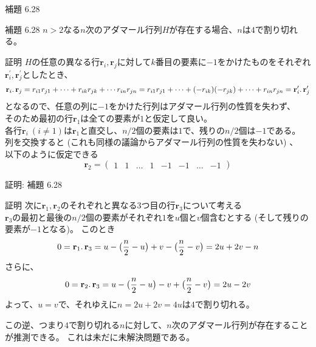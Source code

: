 \documentclass[dvipdfmx,10pt,jsarticle]{beamer}
\begin{document}
  \begin{frame}{補題 6.28}
    \begin{block}{補題 6.28}
      $n > 2$なる$n$次のアダマール行列$H$が存在する場合、$n$は$4$で割り切れる。
    \end{block}

      \begin{block}{証明}
        $H$の任意の異なる行$\mathbf{r}_i, \mathbf{r}_j$に対して$k$番目の要素に$-1$をかけたものをそれぞれ$\mathbf{r}_i^\prime, \mathbf{r}_j^\prime$としたとき、
        \[ \mathbf{r}_i \ldotp \mathbf{r}_j = r_{i1}r_{j1} + \cdots + r_{ik}r_{jk} + \cdots r_{in}r_{jn}
        = r_{i1}r_{j1} + \cdots + (-r_{ik})(-r_{jk}) + \cdots + r_{in}r_{jn} = \mathbf{r}_i^\prime \ldotp \mathbf{r}_j^\prime \]
        となるので、任意の列に$-1$をかけた行列はアダマール行列の性質を失わず、 \\そのため最初の行$\mathbf{r}_1$は全ての要素が$1$と仮定して良い。\\
        各行$\mathbf{r}_i \ (i \neq 1)$は$\mathbf{r}_1$と直交し、$n/2$個の要素は$1$で、残りの$n/2$個は$-1$である。 \\
        列を交換すると (これも同様の議論からアダマール行列の性質を失わない) 、 \\ 以下のように仮定できる
        \[ \mathbf{r}_2 = \begin{pmatrix} 1 & 1 & \ldots & 1 & -1 & -1 & \ldots & -1 \end{pmatrix} \]
      \end{block}
  \end{frame}
  \begin{frame}{証明: 補題 6.28}
      \begin{block}{証明}
        次に$\mathbf{r}_1, \mathbf{r}_2$のそれぞれと異なる$3$つ目の行$\mathbf{r}_3$について考える \\
        $\mathbf{r}_3$の最初と最後の$n/2$個の要素がそれぞれ$1$を$u$個と$v$個含むとする (そして残りの要素が$-1$となる)。 このとき
        \[0 = \mathbf{r}_1 \ldotp \mathbf{r}_3 = u - \big( \frac n2 - u \big) + v - \big( \frac n2 - v \big) = 2u + 2v - n\]
        さらに、
        \[ 0 = \mathbf{r}_2 \ldotp \mathbf{r}_3 = u - \big( \frac n2 - u \big) - v + \big( \frac n2 - v \big) = 2u - 2v \]
        よって、$u = v$で、それゆえに$n = 2u + 2v = 4u$は$4$で割り切れる。
      \end{block}
      この逆、つまり$4$で割り切れる$n$に対して、$n$次のアダマール行列が存在することが推測できる。
      これは未だに未解決問題である。
  \end{frame}
\end{document}
